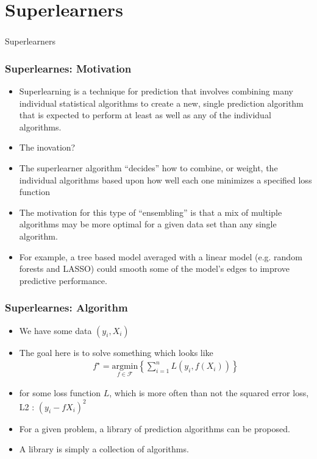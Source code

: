 \documentclass[
  shownotes,
  xcolor={svgnames},
  hyperref={colorlinks,citecolor=DarkBlue,linkcolor=DarkRed,urlcolor=DarkBlue}
  , aspectratio=169]{beamer}
\begin{document}
\section{Superlearners}
\begin{frame}[fragile]
\frametitle{}


\centering
{\huge \textcolor{andesred}{Superlearners}}


\end{frame}
\begin{frame}[fragile]
\frametitle{Superlearnes: Motivation}

\begin{itemize}


\item Superlearning is a technique for prediction that involves combining many individual statistical algorithms  to create a new, single prediction algorithm that is expected to perform at least as well as any of the individual algorithms.
\medskip
\item The inovation?
\pause
\medskip
\item The superlearner algorithm “decides” how to combine, or weight, the individual algorithms based upon how well each one minimizes a specified loss function
\medskip
\item The motivation for this type of “ensembling” is that a mix of multiple algorithms may be more optimal for a given data set than any single algorithm. 
\medskip
\item For example, a tree based model averaged with a linear model (e.g. random forests and LASSO) could smooth some of the model’s edges to improve predictive performance.
\end{itemize}

\end{frame}
\begin{frame}[fragile]
\frametitle{Superlearnes: Algorithm}

\begin{itemize}
  \item We have some data $(y_i,X_i)$
  \medskip
\item The goal here is to solve something which looks like
\begin{align}
f^\star=\underset{f\in\mathcal{F}}{\text{argmin}}\left\lbrace \sum_{i=1}^n L(y_i,f({X}_i)) \right\rbrace
\end{align}


\item for some loss function $L$, which is more often than not the  squared error loss, L2 : $(y_i-f{X}_i)^2$ 
\medskip
\item For a given problem, a library of prediction algorithms can be proposed. 
\medskip
\item A library is simply a collection of algorithms.
\end{itemize}
\end{frame}
\end{document}
